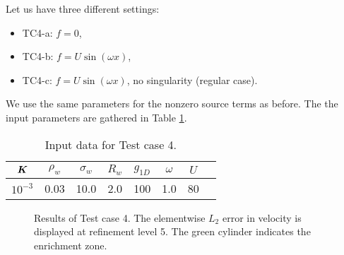 Let us have three different settings: 
\begin{itemize}
    \item TC4-a: $f=0$,
    \item TC4-b: $f=U\sin(\omega x)$,
    \item TC4-c: $f=U\sin(\omega x)$, no singularity (regular case).
\end{itemize}
We use the same parameters for the nonzero source terms as before.
The the input parameters are gathered in Table \ref{tab:tc4_data}.
%
\begin{table}[!htb]
\begin{center}
\begin{tabular}{cccccccc}
\toprule
$\mathbf{\boldsymbol{K}}$ & $\rho_w$ & $\sigma_w$ & $R_w$ & $g_{1D}$ & $\omega$ & $U$ \\
\midrule
$10^{-3}$ & 0.03 & 10.0 & 2.0 & 100 & 1.0 & 80\\
\bottomrule
\end{tabular}
\caption{Input data for Test case 4.}
\label{tab:tc4_data}
\end{center}
\end{table}
%
\begin{figure}[!htb]
    \centering
    \caption[Error distribution in Test case 4.]
    {Results of Test case 4. The elementwise $L_2$ error in velocity is displayed at refinement level 5.
    The green cylinder indicates the enrichment zone. }
    \label{fig:mh_tc4_error}
\end{figure}


